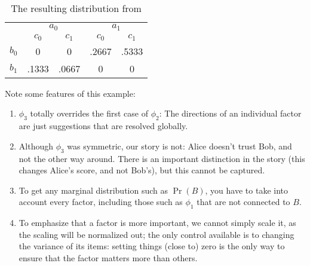 \documentclass{article}
\numberwithin{equation}{section}
\begin{document}
\begin{example}
		\begin{table}[h!]
			\renewcommand{\arraystretch}{1.15} 
			\centering
			\begin{tabular}{c|cc|cc}
				\multicolumn{1}{c}{}&\multicolumn{2}{c}{$a_0$} & \multicolumn{2}{c}{$a_1$} \\[-0.3em]
				&$c_0$ & $c_1$ & $c_0$ & $c_1$ \\\hline
				$b_0$&0 & 0 & .2667 & .5333 \\
				$b_1$&.1333 & .0667 & 0 & 0
			\end{tabular}
			
			\caption{The resulting distribution from }
			\label{tab:fg-exam-dist}
		\end{table}
		
		
		Note some features of this example:
		\begin{enumerate}[nosep]
                \item $\phi_3$ totally overrides the first case of $\phi_2$: The
  directions of an individual factor are just suggestions that are
  resolved globally. 
\item Although $\phi_3$ was symmetric, our
                          story is not: Alice doesn't trust Bob, and
                          not the other way around. There is an
                          important distinction in the story (this
                          changes Alice's score, and not Bob's), but
                          this cannot be captured. 
			\item To get any marginal distribution such as $\Pr(B)$, you have to take into account every factor, including those such as $\phi_1$ that are not connected to $B$.
			\item To emphasize that a factor is more important, we cannot simply scale it, as the scaling will be normalized out; the only control available is to changing the variance of its items: setting things (close to) zero is the only way to ensure that the factor matters more than others.
		\end{enumerate}
	\end{example}
\end{document}
